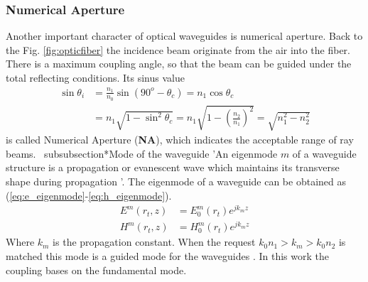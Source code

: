 \subsubsection*{Numerical Aperture }
Another important character of optical waveguides is numerical aperture. Back to the Fig. \ref{fig:opticfiber} the incidence beam originate from the air into the fiber. There is a maximum coupling angle, so that the beam can be guided under the total reflecting conditions. Its sinus value 
\begin{align}
\sin\theta_{i}&=\frac{n_{1}}{n_{0}}\sin(90^{o}-\theta_{c})=n_{1}\cos\theta_{c} \nonumber\\
&=n_{1}\sqrt{1-\sin^{2}\theta_{c}}=n_{1}\sqrt{1-\left(\frac{n_{2}}{n_{1}}\right)^2}=\sqrt{n^2_{1}-n^2_{2}}
\label{eq:NA}
\end{align}
 is called Numerical Aperture (\textbf{NA}), which indicates the acceptable range of ray beams.
\ subsubsection*{Mode of the waveguide}
'An eigenmode $m$ of a waveguide structure is a propagation or evanescent wave which maintains its transverse shape during propagation '\cite{integrated_optics}. The eigenmode of a waveguide can be obtained as (\ref{eq:e_eigenmode}-\ref{eq:h_eigenmode}).  
\begin{align}
E^{m}(r_{t},z)&=E^{m}_{0}(r_{t})e^{jk_{m}z}
\label{eq:e_eigenmode}\\
H^{m}(r_{t},z)&=H^{m}_{0}(r_{t})e^{jk_{m}z}
\label{eq:h_eigenmode}
\end{align}
Where $k_{m}$ is the propagation constant. When the request  $k_{0}n_{1}>k_{m}>k_{0}n_{2}$ is matched this mode is a guided mode for the waveguides \cite{script_FT_TET}. In this work the coupling bases on the fundamental mode.
